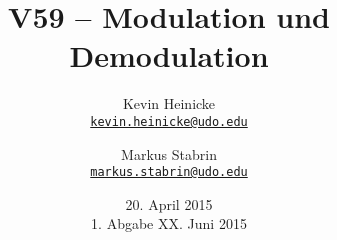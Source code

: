 


\title{%
    V59 -- Modulation und Demodulation
}
\author{%
    Kevin Heinicke\\
    \texttt{\href{mailto:kevin.heinicke@udo.edu}{kevin.heinicke@udo.edu}}
    \and
    Markus Stabrin\\
    \texttt{\href{mailto:markus.stabrin@udo.edu}{markus.stabrin@udo.edu}}
}
\date{%
    20. April 2015\\
    {\small 1. Abgabe} XX. Juni 2015
}

    \maketitle%
    \tableofcontents
    \newpage
    
    
    

    \printbibliography


